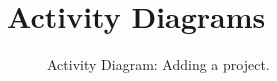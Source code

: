 \section{Activity Diagrams}
\begin{figure}[h]
\centering
{}
\caption{Activity Diagram: Adding a project.}
\end{figure}